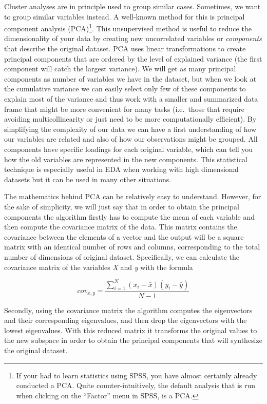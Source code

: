 Cluster analyses are in principle used to group similar
cases. Sometimes, we want to group similar variables instead.  A
well-known method for this is principal component analysis (PCA)\footnote{If your had to learn statistics using SPSS, you have almost certainly already conducted a PCA. Quite counter-intuitively, the default analysis that is run when clicking on the ``Factor'' menu in SPSS, is a PCA.}. This
unsupervised method is useful to reduce the dimensionality of your
data by creating new uncorrelated variables or \textit{components}
that describe the original dataset. PCA uses linear transformations to
create principal components that are ordered by the level of explained
variance (the first component will catch the largest variance). We
will get as many principal components as number of variables we have
in the dataset, but when we look at the cumulative variance we can
easily select only few of these components to explain most of the
variance and thus work with a smaller and summarized data frame that
might be more convenient for many tasks (i.e.\ those that require
avoiding multicollinearity or just need to be more computationally
efficient). By simplifying the complexity of our data we can have a
first understanding of how our variables are related and also of how
our observations might be grouped. All components have specific loadings
for each original variable, which can tell you how the old variables
are represented in the new components. This statistical technique is
especially useful in EDA when working with high dimensional datasets
but it can be used in many other situations.

The mathematics behind PCA can be relatively easy to
understand. However, for the sake of simplicity, we will just say that
in order to obtain the principal components the algorithm firstly has
to compute the mean of each variable and then compute the covariance
matrix of the data. This matrix contains the covariance between the
elements of a vector and the output will be a square matrix with an 
identical number of rows and columns, corresponding to the total
number of dimensions of original dataset. Specifically, we can
calculate the covariance matrix of the variables \emph{X} and \emph{y}
with the formula

$$cov_{x,y}=\frac{\sum_{i=1}^{N}(x_{i}-\bar{x})(y_{i}-\bar{y})}{N-1}$$

Secondly, using the covariance matrix the algorithm computes the eigenvectors and their corresponding eigenvalues, and then drop the eigenvectors with the lowest eigenvalues. With this reduced matrix it transforms the original values to the new subspace in order to obtain the principal components that will synthesize the original dataset.

